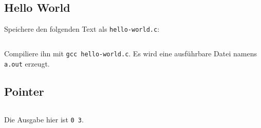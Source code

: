 \subsection{Hello World}
Speichere den folgenden Text als \texttt{hello-world.c}:

\inputminted[linenos, numbersep=5pt, tabsize=4, frame=lines, label=hello-world.c]{c}{scripts/c/hello-world.c}

Compiliere ihn mit \texttt{gcc hello-world.c}. Es wird eine ausführbare
Datei namens \texttt{a.out} erzeugt.

\subsection{Pointer}
\inputminted[linenos, numbersep=5pt, tabsize=4]{c}{scripts/c/pointer.c}

Die Ausgabe hier ist \texttt{0 3}.

